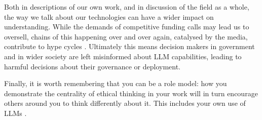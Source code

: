 Both in descriptions of our own work, and in discussion of the field as a whole, the way we talk about our technologies can have a wider impact on understanding. While the demands of competitive funding calls may lead us to oversell, chains of this happening over and over again, catalysed by the media, contribute to hype cycles \citep{markelius2024mechanisms}. Ultimately this means decision makers in government and in wider society are left misinformed about LLM capabilities, leading to harmful decisions about their governance or deployment. 

Finally, it is worth remembering that you can be a role model: how you demonstrate the centrality of ethical  thinking in your work will in turn encourage others around you to think differently about it. This includes your own use of LLMs \citep{guleria_chatgpt_2023,lund_chatgpt_2023}.

